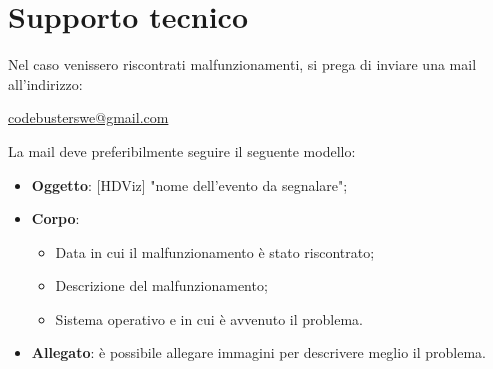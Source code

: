 \section{Supporto tecnico}
Nel caso venissero riscontrati malfunzionamenti, si prega di inviare una mail all'indirizzo:
\begin{center}
\textcolor{blue}{\href{mailto:codebusterswe@gmail.com}{codebusterswe@gmail.com}}
\end{center}
La mail deve preferibilmente seguire il seguente modello:
\begin{itemize}
	\item \textbf{Oggetto}: [HDViz] "nome dell'evento da segnalare";
	\item \textbf{Corpo}: 
	\begin{itemize}
		\item Data in cui il malfunzionamento è stato riscontrato;
		\item Descrizione del malfunzionamento;
		\item Sistema operativo e  in cui è avvenuto il problema.
	\end{itemize}
	\item \textbf{Allegato}: è possibile allegare immagini per descrivere meglio il problema.
\end{itemize}